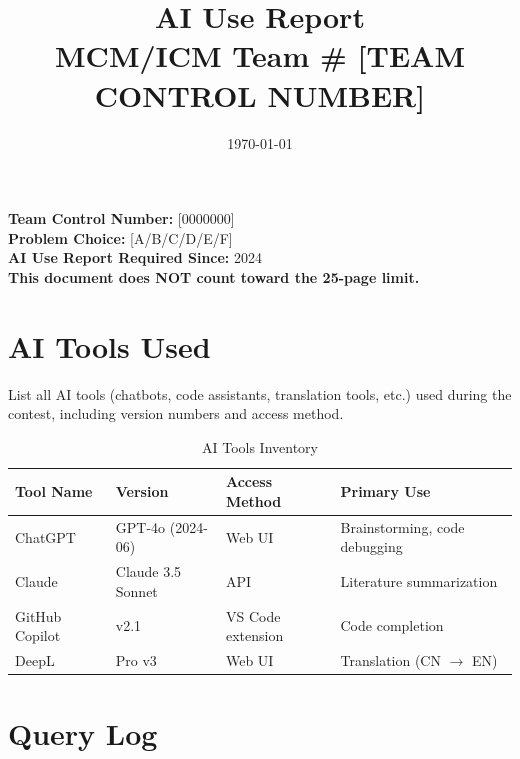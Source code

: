 \documentclass[12pt, a4paper]{article}
\title{\textbf{AI Use Report} \\ \large MCM/ICM Team \# [TEAM CONTROL NUMBER]}
\author{}
\date{\today}
\begin{document}
\maketitle
\thispagestyle{empty}

\begin{center}
\textbf{Team Control Number:} [0000000] \\
\textbf{Problem Choice:} [A/B/C/D/E/F] \\
\textbf{AI Use Report Required Since:} 2024 \\
\textbf{This document does NOT count toward the 25-page limit.}
\end{center}

\vspace{1cm}

\section{AI Tools Used}

List all AI tools (chatbots, code assistants, translation tools, etc.)
used during the contest, including version numbers and access method.

\begin{table}[h]
\centering
\caption{AI Tools Inventory}
\label{tab:ai_tools}
\begin{tabularx}{\textwidth}{lllX}
\toprule
\textbf{Tool Name} & \textbf{Version} & \textbf{Access Method} & \textbf{Primary Use} \\
\midrule
ChatGPT & GPT-4o (2024-06) & Web UI & Brainstorming, code debugging \\
Claude & Claude 3.5 Sonnet & API & Literature summarization \\
GitHub Copilot & v2.1 & VS Code extension & Code completion \\
DeepL & Pro v3 & Web UI & Translation (CN $\to$ EN) \\
\bottomrule
\end{tabularx}
\end{table}

\section{Query Log}
\end{document}
